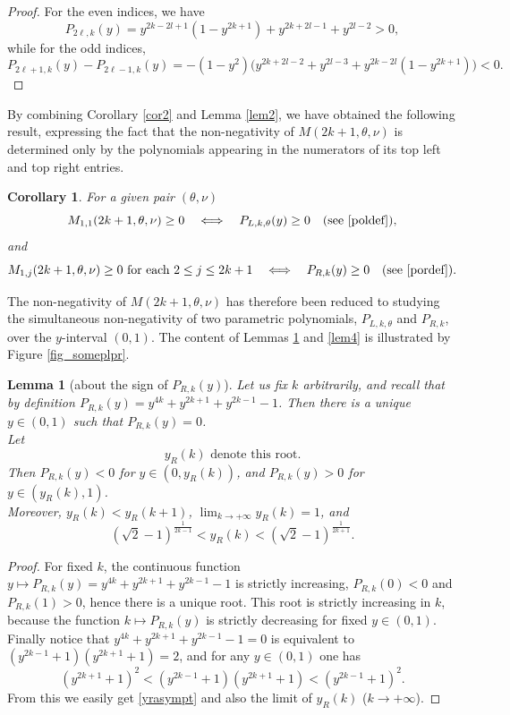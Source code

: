 \documentclass[a4paper]{article}
\newtheorem{lemma}{Lemma}
\newtheorem{corollary}{Corollary}
\newcommand{\te}{\theta}
\newcommand{\yr}{y_R(k)}
\newcommand{\Por}{P_{R,k}(y)}
\newcommand{\Pol}{P_{L,k,\te}(y)}
\begin{document}
\begin{proof} For the even indices, we have
\[
P_{2\ell,k}(y)=y^{2 k-2 l+1}(1-y^{2 k+1})+y^{2 k+2 l-1}+y^{2 l-2}>0,\]
while for the odd indices,
\[
P_{2\ell+1,k}(y)-P_{2\ell-1,k}(y)=-(1 - y^2)\Big(y^{2 k+2 l-2}+y^{2 l-3}+y^{2 k-2 l}(1-y^{2k+1})\Big)<0.
\] 
\end{proof}
By combining Corollary \ref{cor2} and Lemma \ref{lem2}, we have obtained the following result, expressing the fact that the non-negativity of $M(2k+1,\te,\nu)$ is determined only by the polynomials appearing in the numerators of its top left and top right entries.
\begin{corollary}\label{cor3} For a given pair $(\te,\nu)$
\[
M_{1,1}(2k+1,\te,\nu)\ge 0 \quad \Longleftrightarrow \quad \Pol\ge 0 \quad \text{(see } \eqref{poldef}\text{)},
\]
and
\[
M_{1,j}(2k+1,\te,\nu)\ge 0 \text{  for each } 2\le j\le 2k+1 \quad \Longleftrightarrow \quad
\Por\ge 0\quad\text{(see }\eqref{pordef}\text{)}.
\]
\end{corollary}
The non-negativity of $M(2k+1,\te,\nu)$ has therefore been reduced to studying the simultaneous non-negativity of two parametric polynomials, $P_{L,k,\te}$ and $P_{R,k}$, over the $y$-interval $(0,1)$. The content of Lemmas \ref{lem3} and \ref{lem4} is illustrated by Figure \ref{fig_someplpr}.
\begin{lemma}[about the sign of $\Por$]\label{lem3}
Let us fix $k$ arbitrarily, and recall that by definition $\Por=y^{4 k}+y^{2 k+1}+y^{2 k-1}-1$. Then there is a unique $y\in(0,1)$ such that $\Por=0$.\\ 
Let 
\begin{equation}\label{yrdef}\yr \text{ denote this root.}\end{equation} 
Then $\Por<0$ for $y\in(0,\yr)$, and $\Por>0$ for $y\in(\yr,1)$.\\
Moreover, $\yr<y_R(k+1)$, $\lim_{k\to+\infty} \yr=1$, and
\begin{equation}\label{yrasympt}
\left(\sqrt{2}-1\right)^{\frac{1}{2 k-1}}<\yr < \left(\sqrt{2}-1\right)^{\frac{1}{2 k+1}}.
\end{equation}
\end{lemma}
\begin{proof}
For fixed $k$, the continuous function $y\mapsto\Por=y^{4 k}+y^{2 k+1}+y^{2 k-1}-1$ is strictly increasing, 
$P_{R,k}(0)<0$ and $P_{R,k}(1)>0$, hence there is a unique root. This root is strictly increasing in $k$, because the function $k\mapsto\Por$ is strictly decreasing for fixed $y\in(0,1)$. Finally notice that 
$y^{4 k}+y^{2 k+1}+y^{2 k-1}-1=0$ is equivalent to $\left(y^{2 k-1}+1\right) \left(y^{2 k+1}+1\right)=2$,
and for any $y\in(0,1)$ one has
\[
\left(y^{2 k+1}+1\right)^2<\left(y^{2 k-1}+1\right) \left(y^{2 k+1}+1\right)<\left(y^{2 k-1}+1\right)^2.
\]
From this we easily get \eqref{yrasympt} and also the limit of $\yr$ ($k\to +\infty$).
\end{proof}
\end{document}
